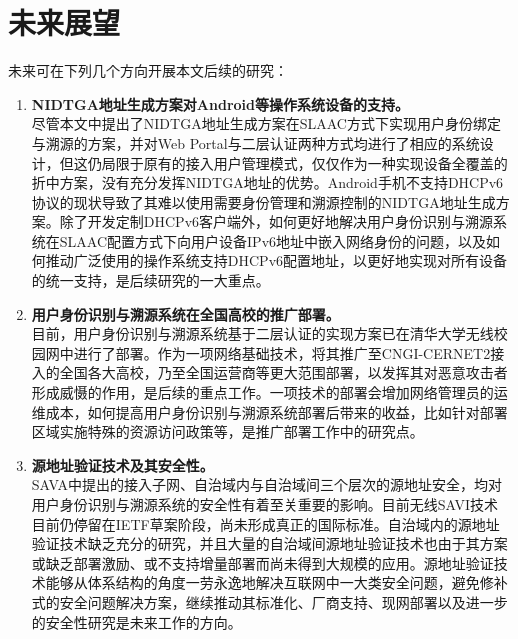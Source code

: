   \section{未来展望}
  \label{future:perspective}
    未来可在下列几个方向开展本文后续的研究：
    \begin{enumerate}[1{)}]
      \item \textbf{NIDTGA地址生成方案对Android等操作系统设备的支持。} \\
        尽管本文中提出了NIDTGA地址生成方案在SLAAC方式下实现用户身份绑定与溯源的方案，并对Web Portal与二层认证两种方式均进行了相应的系统设计，但这仍局限于原有的接入用户管理模式，仅仅作为一种实现设备全覆盖的折中方案，没有充分发挥NIDTGA地址的优势。Android手机不支持DHCPv6协议的现状导致了其难以使用需要身份管理和溯源控制的NIDTGA地址生成方案。除了开发定制DHCPv6客户端外，如何更好地解决用户身份识别与溯源系统在SLAAC配置方式下向用户设备IPv6地址中嵌入网络身份的问题，以及如何推动广泛使用的操作系统支持DHCPv6配置地址，以更好地实现对所有设备的统一支持，是后续研究的一大重点。
      \item \textbf{用户身份识别与溯源系统在全国高校的推广部署。} \\
        目前，用户身份识别与溯源系统基于二层认证的实现方案已在清华大学无线校园网中进行了部署。作为一项网络基础技术，将其推广至CNGI-CERNET2接入的全国各大高校，乃至全国运营商等更大范围部署，以发挥其对恶意攻击者形成威慑的作用，是后续的重点工作。一项技术的部署会增加网络管理员的运维成本，如何提高用户身份识别与溯源系统部署后带来的收益，比如针对部署区域实施特殊的资源访问政策等，是推广部署工作中的研究点。
      \item \textbf{源地址验证技术及其安全性。} \\
        SAVA中提出的接入子网、自治域内与自治域间三个层次的源地址安全，均对用户身份识别与溯源系统的安全性有着至关重要的影响。目前无线SAVI技术目前仍停留在IETF草案阶段，尚未形成真正的国际标准。自治域内的源地址验证技术缺乏充分的研究，并且大量的自治域间源地址验证技术也由于其方案或缺乏部署激励、或不支持增量部署而尚未得到大规模的应用。源地址验证技术能够从体系结构的角度一劳永逸地解决互联网中一大类安全问题，避免修补式的安全问题解决方案，继续推动其标准化、厂商支持、现网部署以及进一步的安全性研究是未来工作的方向。
    \end{enumerate}










